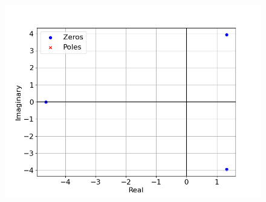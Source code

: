 \documentclass[journal,12pt,twocolumn]{IEEEtran}
\theoremstyle{remark}
\begin{document}

\begin{figure}[htbp]
    \centering
    \includegraphics[width = \columnwidth]{2023/IN/24/figs/poles and root_plot.png}
  \caption{}
    \label{fig:graph1}
\end{figure}

% 
\end{document}
